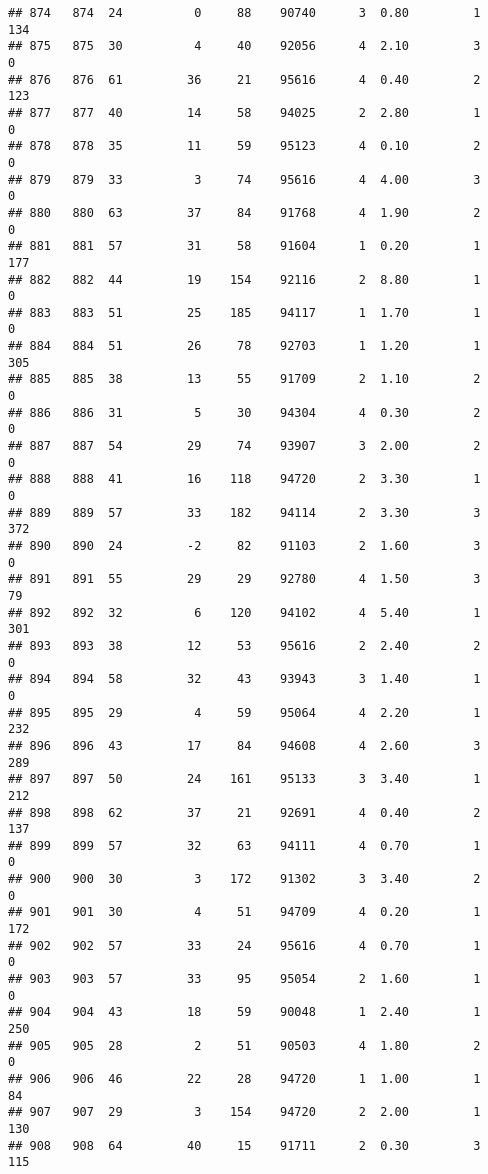 \documentclass[
]{article}
\begin{document}
\begin{verbatim}
## 874   874  24          0     88    90740      3  0.80         1      134
## 875   875  30          4     40    92056      4  2.10         3        0
## 876   876  61         36     21    95616      4  0.40         2      123
## 877   877  40         14     58    94025      2  2.80         1        0
## 878   878  35         11     59    95123      4  0.10         2        0
## 879   879  33          3     74    95616      4  4.00         3        0
## 880   880  63         37     84    91768      4  1.90         2        0
## 881   881  57         31     58    91604      1  0.20         1      177
## 882   882  44         19    154    92116      2  8.80         1        0
## 883   883  51         25    185    94117      1  1.70         1        0
## 884   884  51         26     78    92703      1  1.20         1      305
## 885   885  38         13     55    91709      2  1.10         2        0
## 886   886  31          5     30    94304      4  0.30         2        0
## 887   887  54         29     74    93907      3  2.00         2        0
## 888   888  41         16    118    94720      2  3.30         1        0
## 889   889  57         33    182    94114      2  3.30         3      372
## 890   890  24         -2     82    91103      2  1.60         3        0
## 891   891  55         29     29    92780      4  1.50         3       79
## 892   892  32          6    120    94102      4  5.40         1      301
## 893   893  38         12     53    95616      2  2.40         2        0
## 894   894  58         32     43    93943      3  1.40         1        0
## 895   895  29          4     59    95064      4  2.20         1      232
## 896   896  43         17     84    94608      4  2.60         3      289
## 897   897  50         24    161    95133      3  3.40         1      212
## 898   898  62         37     21    92691      4  0.40         2      137
## 899   899  57         32     63    94111      4  0.70         1        0
## 900   900  30          3    172    91302      3  3.40         2        0
## 901   901  30          4     51    94709      4  0.20         1      172
## 902   902  57         33     24    95616      4  0.70         1        0
## 903   903  57         33     95    95054      2  1.60         1        0
## 904   904  43         18     59    90048      1  2.40         1      250
## 905   905  28          2     51    90503      4  1.80         2        0
## 906   906  46         22     28    94720      1  1.00         1       84
## 907   907  29          3    154    94720      2  2.00         1      130
## 908   908  64         40     15    91711      2  0.30         3      115

\end{verbatim}
\end{document}
